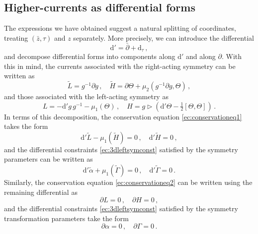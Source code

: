 \documentclass[11pt]{amsart}
\newcommand{\dr}{{\mathrm{d}}}
\numberwithin{equation}{section}
\numberwithin{figure}{section}
\numberwithin{table}{section}
\theoremstyle{thm}
\numberwithin{equation}{subsection}
\theoremstyle{definition}
\theoremstyle{rem}
\begin{document}
\subsection{Higher-currents as differential forms}
\label{sec:highcurrasdifforms}
The expressions we have obtained suggest a natural splitting of coordinates, treating \((\bar z, \tau)\) and \(z\) separately. More precisely, we can introduce the differential
\begin{equation}
    \mathrm{d}' = \bar{\partial} + \mathrm{d}_\tau\,,
\end{equation}
and decompose differential forms into components along \(\mathrm{d}'\) and along \(\partial\). With this in mind, the currents associated with the right-acting symmetry can be written as
\begin{equation}
\label{ec:currents1}
    \tilde{L} = g^{-1} \partial g\,, \quad \tilde{H} = \partial \Theta + \mu_2(g^{-1} \partial g, \Theta)\,,
\end{equation}
and those associated with the left-acting symmetry as
\begin{equation}
\label{ec:currents2}
    L = -\mathrm{d}'g\, g^{-1} - \mu_1(\Theta)\,, \quad 
    H = g \rhd \left( \mathrm{d}'\Theta - \tfrac{1}{2}[\Theta, \Theta] \right)\,.
\end{equation}
In terms of this decomposition, the conservation equation \eqref{ec:conservationeq1} takes the form
\begin{equation}
\label{ec:conseqdifform}
    \mathrm{d}'\tilde{L} - \mu_1(\tilde{H}) = 0\,, \quad \mathrm{d}'\tilde{H} = 0\,,
\end{equation}
and the differential constraints \eqref{ec:3dleftsymconst} satisfied by the symmetry parameters can be written as
\begin{equation}
    \dr' \tilde\alpha + \mu_1 (\tilde \Gamma) =0\,,\quad \dr'\tilde \Gamma = 0\,.
\end{equation}
Similarly, the conservation equation \eqref{ec:conservationeq2} can be written using the remaining differential as 
\begin{equation}
    \partial L = 0\,, \quad \partial H = 0\,,
\end{equation}
and the differential constraints \eqref{ec:3dleftsymconst} satisfied by the symmetry transformation parameters take the form
\begin{equation}
    \partial\alpha = 0 \,,\quad \partial  \Gamma = 0\,.
\end{equation}
\end{document}
